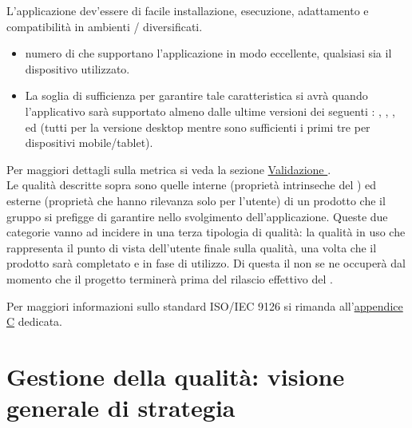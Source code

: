 \documentclass[a4paper, titlepage]{article}
\begin{document}
L'applicazione dev'essere di facile installazione, esecuzione, adattamento e compatibilità in ambienti / diversificati.
\begin{itemize}
\item {} numero di  che supportano l'applicazione in modo eccellente, qualsiasi sia il dispositivo utilizzato. 
\item {} La soglia di sufficienza per garantire tale caratteristica si avrà quando l'applicativo sarà supportato almeno dalle ultime versioni dei seguenti :  , , ,  ed  (tutti per la versione desktop mentre sono sufficienti i primi tre per dispositivi mobile/tablet).
\end{itemize}
Per maggiori dettagli sulla metrica si veda la sezione \hyperref[par:web]{Validazione }.
\\ 
\newline Le qualità descritte sopra sono quelle interne (proprietà intrinseche del ) ed esterne (proprietà che hanno rilevanza solo per l’utente) di un prodotto  che il gruppo si prefigge di garantire nello svolgimento dell'applicazione. Queste due categorie vanno ad incidere in una terza tipologia di qualità: la qualità in uso che rappresenta il punto di vista dell'utente finale sulla qualità, una volta che il prodotto sarà completato e in fase di utilizzo. Di questa il  non se ne occuperà dal momento che il progetto terminerà prima del rilascio effettivo del .

Per maggiori informazioni sullo standard ISO/IEC 9126 si rimanda all'\hyperref[app:iso]{appendice  C} dedicata.

\newpage
\section{Gestione della qualità: visione generale di strategia}
\end{document}
